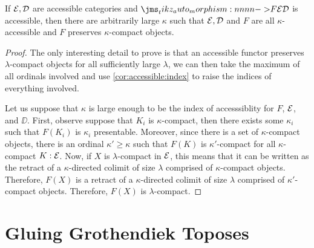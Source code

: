 \documentclass{amsart}
\begin{document}
\begin{corollary}
  \label{cor:accessible:uniform}
  If $\mathcal{E},\mathcal{D}$ are accessible categories and $\Mor[F]{\EE}{\DD}$ is accessible, then there are
  arbitrarily large $\kappa$ such that $\mathcal{E},\mathcal{D}$ and $F$ are all $\kappa$-accessible and $F$
  preserves $\kappa$-compact objects.
\end{corollary}
\begin{proof}
  The only interesting detail to prove is that an accessible functor preserves $\lambda$-compact
  objects for all sufficiently large $\lambda$, we can then take the maximum of all ordinals
  involved and use \cref{cor:accessible:index} to raise the indices of everything involved.

  Let us suppose that $\kappa$ is large enough to be the index of accesssiblity for $F$, $\mathcal{E}$, and
  $\DD$. First, observe suppose that $K_i$ is $\kappa$-compact, then there exists some $\kappa_i$
  such that $F(K_i)$ is $\kappa_i$ presentable. Moreover, since there is a set of $\kappa$-compact
  objects, there is an ordinal $\kappa' \ge \kappa$ such that $F(K)$ is $\kappa'$-compact for all
  $\kappa$-compact $K : \mathcal{E}$. Now, if $X$ is $\lambda$-compact in $\mathcal{E}$, this means that it can be
  written as the retract of a $\kappa$-directed colimit of size $\lambda$ comprised of
  $\kappa$-compact objects. Therefore, $F(X)$ is a retract of a $\kappa$-directed colimit of size
  $\lambda$ comprised of $\kappa'$-compact objects. Therefore, $F(X)$ is $\lambda$-compact.
\end{proof}


\section{Gluing Grothendiek Toposes}
\label{sec:gluing}
\end{document}
